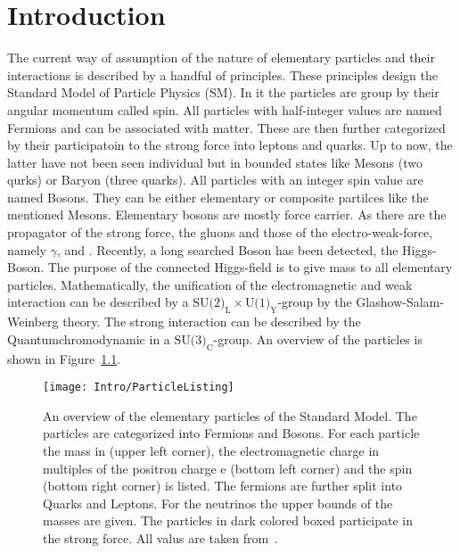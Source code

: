 \chapter{Introduction \label{sec:Intro}}

The current way of assumption of the nature of elementary particles and their interactions is described by a handful of principles. These principles design the Standard Model of Particle Physics (SM). In it the particles are group by their angular momentum called spin. All particles with half-integer values are named Fermions and can be associated with matter. These are then further categorized by their participatoin to the strong force into leptons and quarks. Up to now, the latter have not been seen individual but in bounded states like Mesons (two qurks) or Baryon (three quarks). All particles with an integer spin value are named Bosons. They can be either elementary or composite partilces like the mentioned Mesons. Elementary bosons are mostly force carrier. As there are the propagator of the strong force, the gluons and those of the electro-weak-force, namely $\gamma{}$, \Zz{} and \Wpm{}. Recently, a long searched Boson has been detected, the Higgs-Boson. The purpose of the connected Higgs-field is to give mass to all elementary particles. Mathematically, the unification of the electromagnetic and weak interaction can be described by a $\textrm{SU(2)}_{\textrm{L}} \times \textrm{U(1)}_{\textrm{Y}}$-group by the Glashow-Salam-Weinberg theory. The strong interaction can be described by the Quantumchromodynamic in a $\textrm{SU(3)}_{\textrm{C}}$-group. An overview of the particles is shown in Figure~\ref{plot:IntroParticles}.

\begin{figure}[!htb]
  \centering
  \texttt{[image: Intro/ParticleListing]}
  \caption[Overview over the elementary particles]{An overview of the elementary particles of the Standard Model. The particles are categorized into Fermions and Bosons. For each particle the mass in \MeVcc (upper left corner), the electromagnetic charge in multiples of the positron charge e (bottom left corner) and the spin (bottom right corner) is listed. The fermions are further split into Quarks and Leptons. For the neutrinos the upper bounds of the masses are given. The particles in dark colored boxed participate in the strong force. All valus are taken from~. \label{plot:IntroParticles} }
\end{figure}

